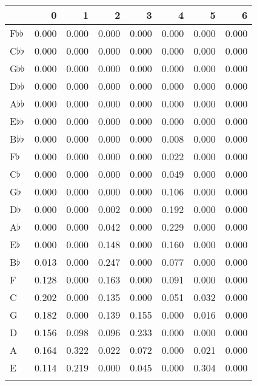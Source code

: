 \begin{tabular}{lrrrrrrr}
\toprule
{} &      0 &      1 &      2 &      3 &      4 &      5 &      6 \\
\midrule
F$\flat$$\flat$   &  0.000 &  0.000 &  0.000 &  0.000 &  0.000 &  0.000 &  0.000 \\
C$\flat$$\flat$   &  0.000 &  0.000 &  0.000 &  0.000 &  0.000 &  0.000 &  0.000 \\
G$\flat$$\flat$   &  0.000 &  0.000 &  0.000 &  0.000 &  0.000 &  0.000 &  0.000 \\
D$\flat$$\flat$   &  0.000 &  0.000 &  0.000 &  0.000 &  0.000 &  0.000 &  0.000 \\
A$\flat$$\flat$   &  0.000 &  0.000 &  0.000 &  0.000 &  0.000 &  0.000 &  0.000 \\
E$\flat$$\flat$   &  0.000 &  0.000 &  0.000 &  0.000 &  0.000 &  0.000 &  0.000 \\
B$\flat$$\flat$   &  0.000 &  0.000 &  0.000 &  0.000 &  0.008 &  0.000 &  0.000 \\
F$\flat$          &  0.000 &  0.000 &  0.000 &  0.000 &  0.022 &  0.000 &  0.000 \\
C$\flat$          &  0.000 &  0.000 &  0.000 &  0.000 &  0.049 &  0.000 &  0.000 \\
G$\flat$          &  0.000 &  0.000 &  0.000 &  0.000 &  0.106 &  0.000 &  0.000 \\
D$\flat$          &  0.000 &  0.000 &  0.002 &  0.000 &  0.192 &  0.000 &  0.000 \\
A$\flat$          &  0.000 &  0.000 &  0.042 &  0.000 &  0.229 &  0.000 &  0.000 \\
E$\flat$          &  0.000 &  0.000 &  0.148 &  0.000 &  0.160 &  0.000 &  0.000 \\
B$\flat$          &  0.013 &  0.000 &  0.247 &  0.000 &  0.077 &  0.000 &  0.000 \\
F                 &  0.128 &  0.000 &  0.163 &  0.000 &  0.091 &  0.000 &  0.000 \\
C                 &  0.202 &  0.000 &  0.135 &  0.000 &  0.051 &  0.032 &  0.000 \\
G                 &  0.182 &  0.000 &  0.139 &  0.155 &  0.000 &  0.016 &  0.000 \\
D                 &  0.156 &  0.098 &  0.096 &  0.233 &  0.000 &  0.000 &  0.000 \\
A                 &  0.164 &  0.322 &  0.022 &  0.072 &  0.000 &  0.021 &  0.000 \\
E                 &  0.114 &  0.219 &  0.000 &  0.045 &  0.000 &  0.304 &  0.000 \\
$$
\end{tabular}
